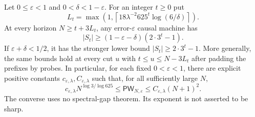 \begin{theorem}
\label{thm:processlower59}
Let $0\le\varepsilon<1$ and $0<\delta<1-\varepsilon$. For an integer
$t\ge0$ put
\begin{equation}\label{eq:testlength59}
 L_t=\max\left(1,\left\lceil18\lambda^{-2}625^t
                                      \log(6/\delta)\right\rceil\right).
\end{equation}
At every horizon $N\ge t+3L_t$, any error-$\varepsilon$ causal machine
has
\begin{equation}\label{eq:processcutlower59}
 |S_t|\ge(1-\varepsilon-\delta)(2\cdot3^t-1).
\end{equation}
If $\varepsilon+\delta<1/2$, it has the stronger lower bound
$|S_t|\ge2\cdot3^t-1$. More generally, the same bounds hold at every
cut $u$ with $t\le u\le N-3L_t$ after padding the prefixes by probes.
In particular, for each fixed $0<\varepsilon<1$, there are explicit
positive constants $c_{\varepsilon,\lambda},C_{\varepsilon,\lambda}$
such that, for all sufficiently large $N$,
\begin{equation}\label{eq:processgrowth59}
 c_{\varepsilon,\lambda}N^{\log3/\log625}
 \le\mathsf{PW}_{N,\varepsilon}
 \le C_{\varepsilon,\lambda}(N+1)^2.
\end{equation}
The converse uses no spectral-gap theorem. Its exponent is not asserted
to be sharp.
\end{theorem}
